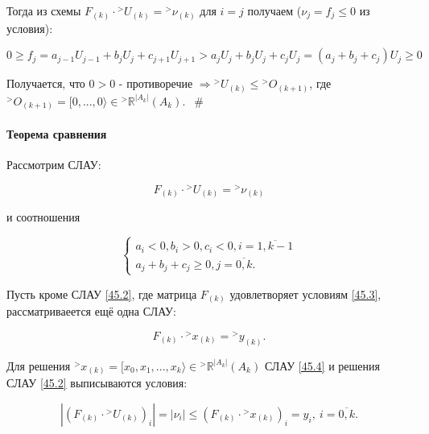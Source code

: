 \documentclass[__main__.tex]{subfiles}
\begin{document}
Тогда из схемы $F_{\left(k\right)} \cdot {}^>U_{\left(k\right)} = {}^>\nu_{\left(k\right)}$ для $i=j$ получаем ($\nu_j = f_j \leq 0$ из условия):

$$
0 \geq f_j = a_{j-1} U_{j-1} + b_j U_j + c_{j+1} U_{j+1} > a_j U_j + b_j U_j + c_j U_j = \left(a_j + b_j + c_j\right) U_j \geq 0
$$

Получается, что $0>0$ - противоречие $\Rightarrow {}^> U_{\left(k\right)} \leq {}^> O_{\left(k+1\right)}$, где ${}^> O_{\left(k+1\right)} = [0,...,0 \rangle \in {}^> \mathbb{R}^{\left|A_k\right|}\left(A_k\right)$. $ \ \ \#$

\paragraph{Теорема сравнения}

Рассмотрим СЛАУ:

\begin{equation} \label{45.2}
F_{\left(k\right)} \cdot {}^> U_{\left(k\right)} = {}^> \nu_{\left(k\right)}
\end{equation}

и соотношения

\begin{equation} \label{45.3}
\begin{cases}
a_i < 0, b_i > 0, c_i < 0, i = \overline{1,k-1} \\
a_j+b_j+c_j \geq 0, j =\overline{0,k}.
\end{cases}
\end{equation}

Пусть кроме СЛАУ \ref{45.2}, где матрица $F_{\left(k\right)}$ удовлетворяет условиям \ref{45.3}, рассматриваеется ещё одна СЛАУ:

\begin{equation}\label{45.4}
F_{\left(k\right)} \cdot {}^> x_{\left(k\right)} = {}^> y_{\left(k\right)}.
\end{equation}

Для решения ${}^> x_{\left(k\right)} = [x_0, x_1, ..., x_k\rangle \in {}^> \mathbb{R}^{\left|A_k\right|} \left(A_k\right)$ СЛАУ \ref{45.4} и решения СЛАУ \ref{45.2} выписываются условия:

\begin{equation}\label{45.5}
\left| \left(F_{\left(k\right)} \cdot {}^> U_{\left(k\right)}\right)_i \right| = \left|\nu_i\right| \leq \left(F_{\left(k\right)} \cdot {}^> x_{\left(k\right)}\right)_i = y_i, \ i = \overline{0,k}.
\end{equation}
\end{document}

